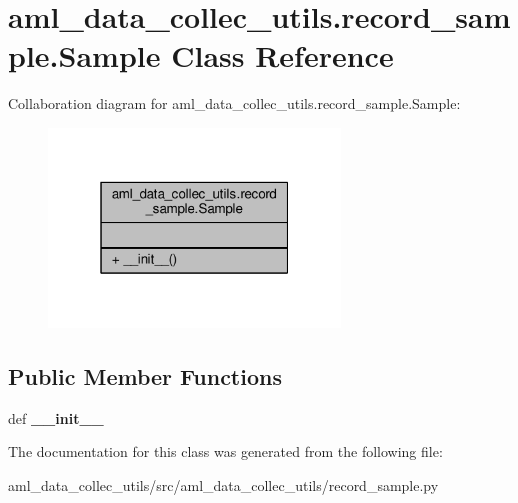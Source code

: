 \hypertarget{classaml__data__collec__utils_1_1record__sample_1_1_sample}{\section{aml\-\_\-data\-\_\-collec\-\_\-utils.\-record\-\_\-sample.\-Sample Class Reference}
\label{classaml__data__collec__utils_1_1record__sample_1_1_sample}
}


Collaboration diagram for aml\-\_\-data\-\_\-collec\-\_\-utils.\-record\-\_\-sample.\-Sample\-:\nopagebreak
\begin{figure}[H]
\begin{center}
\leavevmode
\includegraphics[width=220pt]{classaml__data__collec__utils_1_1record__sample_1_1_sample__coll__graph}
\end{center}
\end{figure}
\subsection*{Public Member Functions}
\begin{DoxyCompactItemize}
\item 
\hypertarget{classaml__data__collec__utils_1_1record__sample_1_1_sample_aec601499ea26c9738626b603c193b962}{def {\bfseries \-\_\-\-\_\-init\-\_\-\-\_\-}}\label{classaml__data__collec__utils_1_1record__sample_1_1_sample_aec601499ea26c9738626b603c193b962}

\end{DoxyCompactItemize}


The documentation for this class was generated from the following file\-:\begin{DoxyCompactItemize}
\item 
aml\-\_\-data\-\_\-collec\-\_\-utils/src/aml\-\_\-data\-\_\-collec\-\_\-utils/record\-\_\-sample.\-py\end{DoxyCompactItemize}
